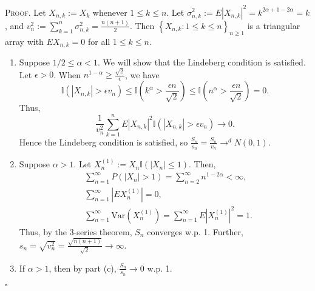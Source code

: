 \documentclass[12pt]{article}
\newcounter{ProofCounter}
\newenvironment{Proof}{\stepcounter{ProofCounter}\textsc{Proof.}}{\hfill$\square$}
\begin{document}
\begin{Proof}
  Let $X_{n,k} := X_{k}$ whenever $1 \leq k \leq n$. Let $\sigma_{n,k}^{2} := E|X_{n,k}|^{2} = k^{2\alpha + 1 - 2\alpha} = k$, and $v_{n}^{2} :=
  \sum_{k=1}^{n}\sigma_{n,k}^{2} = \frac{n(n+1)}{2}$. Then $\left\{ X_{n,k} : 1 \leq k \leq n \right\}_{n\geq 1}$ is a triangular array with $EX_{n,k}
  = 0$ for all $1 \leq k \leq n$.
  \begin{enumerate}[label = (\alph*)]
    \item Suppose $1/2 \leq \alpha < 1$. We will show that the Lindeberg condition is satisfied. Let $\epsilon > 0$. When $n^{1 - \alpha} \geq
      \frac{\sqrt{2}}{\epsilon}$, we have 
      \[ 
        \mathbb{I}(|X_{n,k}| > \epsilon v_{n}) \leq \mathbb{I}\left(k^{\alpha} > \frac{\epsilon n}{\sqrt{2}}\right) \leq \mathbb{I}\left(n^{\alpha} >
        \frac{\epsilon n}{\sqrt{2}}\right) = 0.
      \]
      Thus,
      \[ \frac{1}{v_{n}^{2}}\sum_{k=1}^{n}E|X_{n,k}|^{2}\mathbb{I}(|X_{n,k}| > \epsilon v_{n}) \rightarrow 0. \]
      Hence the Lindeberg condition is satisfied, so $\frac{S_{n}}{s_{n}} = \frac{S_{n}}{v_{n}} \rightarrow^{d} N(0,1)$.\addtocounter{enumi}{1} 
    \item Suppose $\alpha > 1$. Let $X_{n}^{(1)} := X_{n}\mathbb{I}(|X_{n}| \leq 1)$. Then,
      \begin{align*}
        & \sum_{n=1}^{\infty}P(|X_{n}| > 1) = \sum_{n=2}^{\infty}n^{1-2\alpha} < \infty, \\
        & \sum_{n=1}^{\infty}|EX_{n}^{(1)}| = 0, \\
        & \sum_{n=1}^{\infty}\text{Var}(X_{n}^{(1)}) = \sum_{n=1}^{\infty}E|X_{n}^{(1)}|^{2} = 1.
      \end{align*}
      Thus, by the 3-series theorem, $S_{n}$ converges w.p. 1. Further, $s_{n} = \sqrt{v_{n}^{2}} = \frac{\sqrt{n(n+1)}}{\sqrt{2}} \rightarrow
      \infty$. \addtocounter{enumi}{-2}
    \item If $\alpha > 1$, then by part (c), $\frac{S_{n}}{s_{n}} \rightarrow 0$ w.p. 1.
  \end{enumerate}
\end{Proof}


\newpage
\end{document}
